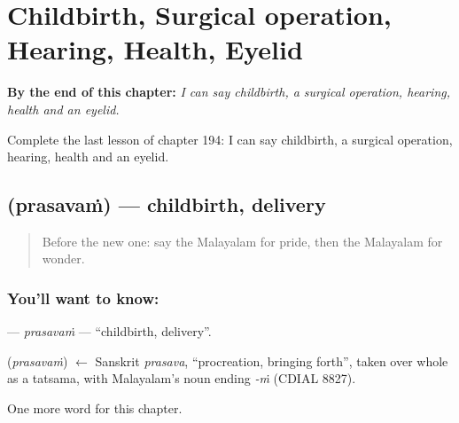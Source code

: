 
\chapter{Childbirth, Surgical operation, Hearing, Health, Eyelid}
\label{ch:ml-childbirth-surgical-operation-hearing-health-eyelid}

\begin{chapteropening}
\textbf{By the end of this chapter:} \emph{I can say childbirth, a surgical operation, hearing, health and an eyelid.}

Complete the last lesson of chapter 194: I can say childbirth, a surgical operation, hearing, health and an eyelid.
\end{chapteropening}

\section[\texorpdfstring{\ml{പ്രസവം} (prasavaṁ)}{പ്രസവം (prasavaṁ)}]{ (prasavaṁ) — childbirth, delivery}

\label{lesson:ML-C194-prasavam}



\begin{quote}
Before the new one: say the Malayalam for pride, then the Malayalam for wonder.
\end{quote}

\subsection*{You'll want to know: }
\textbf{} — \emph{prasavaṁ} — \textquotedblleft{}childbirth, delivery\textquotedblright{}.

\begin{cousinweb}
\textbf{} (\emph{prasavaṁ}) $\leftarrow$ Sanskrit \emph{prasava}, \textquotedblleft{}procreation, bringing forth\textquotedblright{}, taken over whole as a tatsama, with Malayalam's noun ending \emph{-ṁ} (CDIAL 8827).
\end{cousinweb}

\begin{grammarlens}[title={What you've built}]
One more word for this chapter.
\end{grammarlens}

